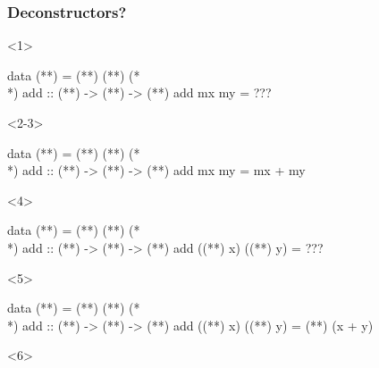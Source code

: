 \documentclass[17pt]{beamer}
\renewcommand{\(}[1]{\begin{columns}[#1]}
\renewcommand{\)}{\end{columns}}
\newcommand{\<}[1]{\begin{column}{#1}}
\renewcommand{\>}{\end{column}}
\begin{document}
\begin{frame}[fragile]
  \frametitle{Deconstructors?}
  \begin{minipage}[t][.4\textheight]{\textwidth}
    \begin{onlyenv}<1>
      \begin{code}
data (**) = (**) (**)
(*\\*)
add :: (**) -> (**) -> (**)
add mx my = ???
      \end{code}
    \end{onlyenv}
    \begin{onlyenv}<2-3>
      \begin{code}
data (**) = (**) (**)
(*\\*)
add :: (**) -> (**) -> (**)
add mx my = mx + my
      \end{code}
    \end{onlyenv}
    \begin{onlyenv}<4>
      \begin{code}
data (**) = (**) (**)
(*\\*)
add :: (**) -> (**) -> (**)
add ((**) x) ((**) y) = ???
      \end{code}
    \end{onlyenv}
    \begin{onlyenv}<5>
      \begin{code}
data (**) = (**) (**)
(*\\*)
add :: (**) -> (**) -> (**)
add ((**) x) ((**) y) = (**) (x + y)
      \end{code}
    \end{onlyenv}
    \begin{onlyenv}<6>
    \end{onlyenv}
  \end{minipage}
  \begin{minipage}[c][.3\textheight]{\textwidth}
    \begin{center}
    \end{center}
  \end{minipage}
\end{frame}
\end{document}
